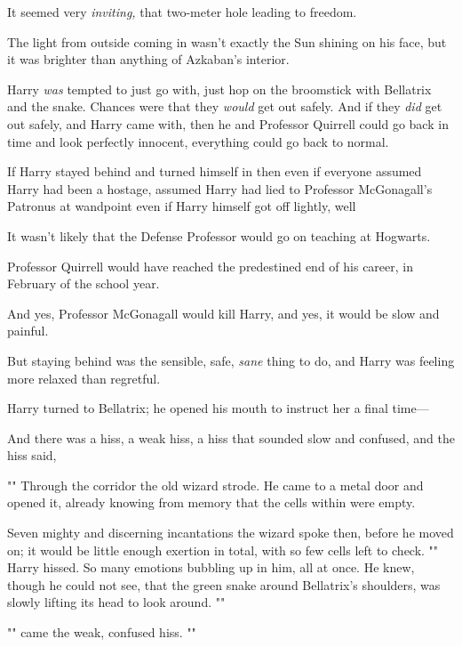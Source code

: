 It seemed very{\el} \emph{inviting,} that two-meter hole leading to freedom.

The light from outside coming in{\el} wasn't exactly the Sun shining on his
face, but it was brighter than anything of Azkaban's interior.

Harry \emph{was} tempted to just go with, just hop on the broomstick with
Bellatrix and the snake. Chances were that they \emph{would} get out safely.
And if they \emph{did} get out safely, and Harry came with, then he and
Professor Quirrell could go back in time and look perfectly innocent,
everything could go back to normal.

If Harry stayed behind and turned himself in{\el} then even if everyone
assumed Harry had been a hostage, assumed Harry had lied to Professor
McGonagall's Patronus at wandpoint{\el} even if Harry himself got off
lightly, well{\el}

It wasn't likely that the Defense Professor would go on teaching at Hogwarts.

Professor Quirrell would have reached the predestined end of his career, in
February of the school year.

And yes, Professor McGonagall would kill Harry, and yes, it would be slow and
painful.

But staying behind was the sensible, safe, \emph{sane} thing to do, and Harry
was feeling more relaxed than regretful.

Harry turned to Bellatrix; he opened his mouth to instruct her a final time---

And there was a hiss, a weak hiss, a hiss that sounded slow and confused, and
the hiss said,

""
\sbreak
Through the corridor the old wizard strode. He came to a metal door and opened
it, already knowing from memory that the cells within were empty.

Seven mighty and discerning incantations the wizard spoke then, before he moved
on; it would be little enough exertion in total, with so few cells left to
check.
\sbreak
"" Harry hissed. So many emotions bubbling up in him, all at
once. He knew, though he could not see, that the green snake around Bellatrix's
shoulders, was slowly lifting its head to look around. ""

"" came the weak, confused hiss. ""

